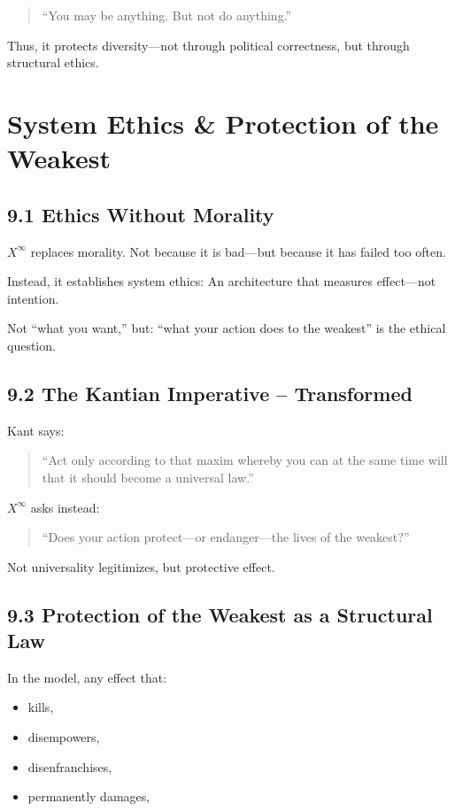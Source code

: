 \documentclass[12pt,a4paper]{book}
\begin{document}
\begin{quote}
“You may be anything.  
But not do anything.”  
\end{quote}

Thus, it protects diversity—not through political correctness,  
but through structural ethics.

\chapter{System Ethics \& Protection of the Weakest}

\section*{9.1 Ethics Without Morality}

$X^\infty$ replaces morality.  
Not because it is bad—but because it has failed too often.

Instead, it establishes system ethics:  
An architecture that measures effect—not intention.

Not “what you want,”  
but: “what your action does to the weakest”  
is the ethical question.

\section*{9.2 The Kantian Imperative – Transformed}

Kant says:  
\begin{quote}
“Act only according to that maxim whereby you can at the same time will  
that it should become a universal law.”  
\end{quote}

$X^\infty$ asks instead:  
\begin{quote}
“Does your action protect—or endanger—the lives of the weakest?”  
\end{quote}

Not universality legitimizes,  
but protective effect.

\section*{9.3 Protection of the Weakest as a Structural Law}

In the model, any effect that:

\begin{itemize}
    \item kills,
    \item disempowers,
    \item disenfranchises,
    \item permanently damages,
\end{itemize}
\end{document}
